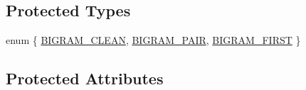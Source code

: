 \subsection*{Protected Types}
\begin{DoxyCompactItemize}
\item 
enum \{ \hyperlink{classCSphBigramTokenizer_a38a865c09d1720954d9817f4ae6cbf49af8817da5962ff9d77cdc2595ea217130}{B\-I\-G\-R\-A\-M\-\_\-\-C\-L\-E\-A\-N}, 
\hyperlink{classCSphBigramTokenizer_a38a865c09d1720954d9817f4ae6cbf49a7dcb5140f2f0dece5869ac7412fba6e5}{B\-I\-G\-R\-A\-M\-\_\-\-P\-A\-I\-R}, 
\hyperlink{classCSphBigramTokenizer_a38a865c09d1720954d9817f4ae6cbf49a0c66a664fc41f9bb29e7b362d58f031c}{B\-I\-G\-R\-A\-M\-\_\-\-F\-I\-R\-S\-T}
 \}
\end{DoxyCompactItemize}
\subsection*{Protected Attributes}
